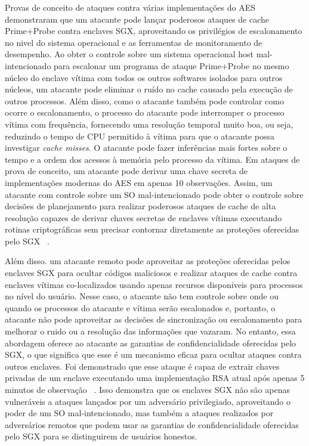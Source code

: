 \documentclass[review]{elsarticle}
\begin{document}
Provas de conceito de ataques contra várias implementações do AES demonstraram que um atacante pode lançar poderosos ataques de cache Prime+Probe contra enclaves SGX, aproveitando os privilégios de escalonamento no nivel do sistema operacional e as ferramentas de monitoramento de desempenho. Ao obter o controle sobre um sistema operacional host mal-intencionado para escalonar um programa de ataque Prime+Probe no mesmo núcleo do enclave vítima com todos os outros softwares isolados para outros núcleos, um atacante pode eliminar o ruído no cache causado pela execução de outros processos. Além disso, como o atacante também pode controlar como ocorre o escalonamento, o processo do atacante pode interromper o processo vítima com frequência, fornecendo uma resolução temporal muito boa, ou seja, reduzindo o tempo de CPU permitido à vítima para que o atacante possa investigar \emph{cache misses}. O atacante pode fazer inferências mais fortes sobre o tempo e a ordem dos acessos à memória pelo processo da vítima. Em ataques de prova de conceito, um atacante pode derivar uma chave secreta de implementações modernas do AES em apenas 10 observações. Assim, um atacante com controle sobre um SO mal-intencionado pode obter o controle sobre decisões de planejamento para realizar poderosos ataques de cache de alta resolução capazes de derivar chaves secretas de enclaves vítimas executando rotinas criptográficas sem precisar contornar diretamente as proteções oferecidas pelo SGX ~\cite{moghimi_cachezoom:_2017, gotzfried_cache_2017}.

Além disso. um atacante remoto pode aproveitar as proteções oferecidas pelos enclaves SGX para ocultar códigos maliciosos e realizar ataques de cache contra enclaves vítimas co-localizados usando apenas recursos disponiveis para processos no nível do usuário. Nesse caso, o atacante não tem controle sobre onde ou quando os processos do atacante e vítima serão escalonados e, portanto, o atacante não pode aproveitar as decisões de sincronização ou escalonamento para melhorar o ruido ou a resolução das informações que vazaram. No entanto, essa abordagem oferece ao atacante as garantias de confidencialidade oferecidas pelo SGX, o que significa que esse é um mecanismo eficaz para ocultar ataques contra outros enclaves. Foi demonstrado que esse ataque é capaz de extrair chaves privadas de um enclave executando uma implementação RSA atual após apenas 5 minutos de observação ~\cite{schwarz_malware_2017}. Isso demonstra que os enclaves SGX não são apenas vulneráveis a ataques lançados por um adversário privilegiado, aproveitando o poder de um SO mal-intencionado, mas também a ataques realizados por adversários remotos que podem usar as garantias de confidencialidade oferecidas pelo SGX para se distinguirem de usuários honestos.
\end{document}
